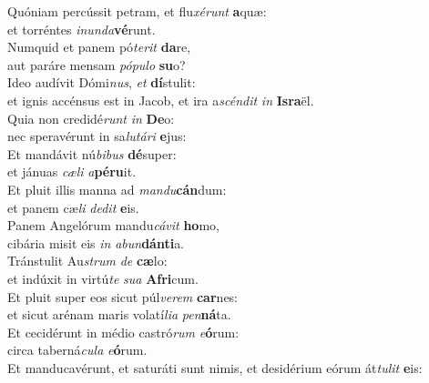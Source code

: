 \oddverse Quóniam percússit petram, et flu\textit{xé}\textit{runt} \textbf{a}quæ:~\*\\
\oddverse et torréntes \textit{i}\textit{nun}\textit{da}\textbf{vé}runt.\\
\evenverse Numquid et panem pó\textit{te}\textit{rit} \textbf{da}re,~\*\\
\evenverse aut paráre mensam \textit{pó}\textit{pu}\textit{lo} \textbf{su}o?\\
\oddverse Ideo audívit Dómi\textit{nus}, \textit{et} \textbf{dí}stulit:~\*\\
\oddverse et ignis accénsus est in Jacob, et ira a\textit{scén}\textit{dit} \textit{in} \textbf{Is}\textbf{ra}ël.\\
\evenverse Quia non credidé\textit{runt} \textit{in} \textbf{De}o:~\*\\
\evenverse nec speravérunt in sa\textit{lu}\textit{tá}\textit{ri} \textbf{e}jus:\\
\oddverse Et mandávit nú\textit{bi}\textit{bus} \textbf{dé}super:~\*\\
\oddverse et jánuas \textit{cæ}\textit{li} \textit{a}\textbf{pé}\textbf{ru}it.\\
\evenverse Et pluit illis manna ad \textit{man}\textit{du}\textbf{cán}dum:~\*\\
\evenverse et panem cæ\textit{li} \textit{de}\textit{dit} \textbf{e}is.\\
\oddverse Panem Angelórum mandu\textit{cá}\textit{vit} \textbf{ho}mo,~\*\\
\oddverse cibária misit eis \textit{in} \textit{a}\textit{bun}\textbf{dán}\textbf{ti}a.\\
\evenverse Tránstulit Au\textit{strum} \textit{de} \textbf{cæ}lo:~\*\\
\evenverse et indúxit in virtú\textit{te} \textit{su}\textit{a} \textbf{A}\textbf{fri}cum.\\
\oddverse Et pluit super eos sicut púl\textit{ve}\textit{rem} \textbf{car}nes:~\*\\
\oddverse et sicut arénam maris volatí\textit{li}\textit{a} \textit{pen}\textbf{ná}ta.\\
\evenverse Et cecidérunt in médio castró\textit{rum} \textit{e}\textbf{ó}rum:~\*\\
\evenverse circa taberná\textit{cu}\textit{la} \textit{e}\textbf{ó}rum.\\
\oddverse Et manducavérunt, et saturáti sunt nimis, et desidérium eórum át\textit{tu}\textit{lit} \textbf{e}is:~\*\\
